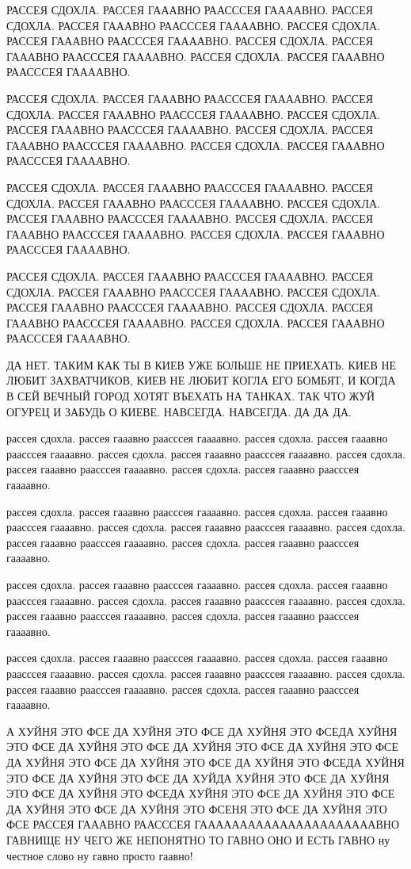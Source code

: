 РАССЕЯ СДОХЛА. РАССЕЯ ГАААВНО РААСССЕЯ ГААААВНО. РАССЕЯ СДОХЛА. РАССЕЯ ГАААВНО
РААСССЕЯ ГААААВНО. РАССЕЯ СДОХЛА. РАССЕЯ ГАААВНО РААСССЕЯ ГААААВНО. РАССЕЯ
СДОХЛА. РАССЕЯ ГАААВНО РААСССЕЯ ГААААВНО. РАССЕЯ СДОХЛА. РАССЕЯ ГАААВНО
РААСССЕЯ ГААААВНО.

РАССЕЯ СДОХЛА. РАССЕЯ ГАААВНО РААСССЕЯ ГААААВНО. РАССЕЯ СДОХЛА. РАССЕЯ ГАААВНО
РААСССЕЯ ГААААВНО. РАССЕЯ СДОХЛА. РАССЕЯ ГАААВНО РААСССЕЯ ГААААВНО. РАССЕЯ
СДОХЛА. РАССЕЯ ГАААВНО РААСССЕЯ ГААААВНО. РАССЕЯ СДОХЛА. РАССЕЯ ГАААВНО
РААСССЕЯ ГААААВНО.

РАССЕЯ СДОХЛА. РАССЕЯ ГАААВНО РААСССЕЯ ГААААВНО. РАССЕЯ СДОХЛА. РАССЕЯ ГАААВНО
РААСССЕЯ ГААААВНО. РАССЕЯ СДОХЛА. РАССЕЯ ГАААВНО РААСССЕЯ ГААААВНО. РАССЕЯ
СДОХЛА. РАССЕЯ ГАААВНО РААСССЕЯ ГААААВНО. РАССЕЯ СДОХЛА. РАССЕЯ ГАААВНО
РААСССЕЯ ГААААВНО.

РАССЕЯ СДОХЛА. РАССЕЯ ГАААВНО РААСССЕЯ ГААААВНО. РАССЕЯ СДОХЛА. РАССЕЯ ГАААВНО
РААСССЕЯ ГААААВНО. РАССЕЯ СДОХЛА. РАССЕЯ ГАААВНО РААСССЕЯ ГААААВНО. РАССЕЯ
СДОХЛА. РАССЕЯ ГАААВНО РААСССЕЯ ГААААВНО. РАССЕЯ СДОХЛА. РАССЕЯ ГАААВНО
РААСССЕЯ ГААААВНО.

ДА НЕТ. ТАКИМ КАК ТЫ В КИЕВ УЖЕ БОЛЬШЕ НЕ ПРИЕХАТЬ. КИЕВ НЕ ЛЮБИТ ЗАХВАТЧИКОВ,
КИЕВ НЕ ЛЮБИТ КОГЛА ЕГО БОМБЯТ, И КОГДА В СЕЙ ВЕЧНЫЙ ГОРОД ХОТЯТ ВЪЕХАТЬ НА
ТАНКАХ. ТАК ЧТО ЖУЙ ОГУРЕЦ И ЗАБУДЬ О КИЕВЕ. НАВСЕГДА. НАВСЕГДА. ДА ДА ДА.

рассея сдохла. рассея гааавно раасссея гаааавно. рассея сдохла. рассея гааавно
раасссея гаааавно. рассея сдохла. рассея гааавно раасссея гаааавно. рассея
сдохла. рассея гааавно раасссея гаааавно. рассея сдохла. рассея гааавно
раасссея гаааавно.

рассея сдохла. рассея гааавно раасссея гаааавно. рассея сдохла. рассея гааавно
раасссея гаааавно. рассея сдохла. рассея гааавно раасссея гаааавно. рассея
сдохла. рассея гааавно раасссея гаааавно. рассея сдохла. рассея гааавно
раасссея гаааавно.

рассея сдохла. рассея гааавно раасссея гаааавно. рассея сдохла. рассея гааавно
раасссея гаааавно. рассея сдохла. рассея гааавно раасссея гаааавно. рассея
сдохла. рассея гааавно раасссея гаааавно. рассея сдохла. рассея гааавно
раасссея гаааавно.

рассея сдохла. рассея гааавно раасссея гаааавно. рассея сдохла. рассея гааавно
раасссея гаааавно. рассея сдохла. рассея гааавно раасссея гаааавно. рассея
сдохла. рассея гааавно раасссея гаааавно. рассея сдохла. рассея гааавно
раасссея гаааавно.

А ХУЙНЯ ЭТО ФСЕ ДА ХУЙНЯ ЭТО ФСЕ ДА ХУЙНЯ ЭТО ФСЕДА ХУЙНЯ ЭТО ФСЕ ДА ХУЙНЯ ЭТО ФСЕ ДА ХУЙНЯ ЭТО ФСЕ ДА ХУЙНЯ ЭТО ФСЕ ДА ХУЙНЯ ЭТО ФСЕ ДА ХУЙНЯ ЭТО ФСЕ ДА ХУЙНЯ ЭТО ФСЕДА ХУЙНЯ ЭТО ФСЕ ДА ХУЙНЯ ЭТО ФСЕ ДА ХУЙДА ХУЙНЯ ЭТО ФСЕ ДА ХУЙНЯ ЭТО ФСЕ ДА ХУЙНЯ ЭТО ФСЕДА ХУЙНЯ ЭТО ФСЕ ДА ХУЙНЯ ЭТО ФСЕ ДА ХУЙНЯ ЭТО ФСЕ ДА ХУЙНЯ ЭТО ФСЕНЯ ЭТО ФСЕ ДА ХУЙНЯ ЭТО ФСЕ РАССЕЯ ГАААВНО РААСССЕЯ ГААААААААААААААААААААААВНО ГАВНИЩЕ НУ ЧЕГО ЖЕ НЕПОНЯТНО ТО ГАВНО ОНО И ЕСТЬ ГАВНО ну честное слово ну гавно просто гаавно!

